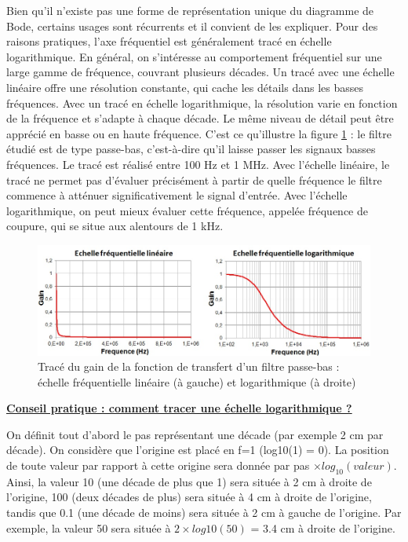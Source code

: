 	\vspace{0.5\baselineskip}

	Bien qu'il n'existe pas une forme de représentation unique du diagramme de Bode, certains usages sont récurrents et il convient de les expliquer. Pour des raisons pratiques, l'axe fréquentiel est généralement tracé en échelle logarithmique. En général, on s'intéresse au comportement fréquentiel sur une large gamme de fréquence, couvrant plusieurs décades. Un tracé avec une échelle linéaire offre une résolution constante, qui cache les détails dans les basses fréquences. Avec un tracé en échelle logarithmique, la résolution varie en fonction de la fréquence et s'adapte à chaque décade. Le même niveau de détail peut être apprécié en basse ou en haute fréquence. C'est ce qu'illustre la figure \ref{Fig:Effet_Flin_log} : le filtre étudié est de type passe-bas, c'est-à-dire qu'il laisse passer les signaux basses fréquences. Le tracé est réalisé entre 100 Hz et 1 MHz. Avec l'échelle linéaire, le tracé ne permet pas d'évaluer précisément à partir de quelle fréquence le filtre commence à atténuer significativement le signal d'entrée. Avec l'échelle logarithmique, on peut mieux évaluer cette fréquence, appelée fréquence de coupure, qui se situe aux alentours de 1 kHz.
	\begin{figure}[h]
		\centering
		\includegraphics[scale=0.6]{images/Effet_Flin_log.jpg}
		\caption{Tracé du gain de la fonction de transfert d'un filtre passe-bas : échelle fréquentielle linéaire (à gauche) et logarithmique (à droite)}	
		\label{Fig:Effet_Flin_log} 
	\end{figure}
	
	\textbf{\underline{Conseil pratique : comment tracer une échelle logarithmique ?}}
	
	On définit tout d'abord le pas représentant une décade (par exemple 2 cm par décade). On considère que l'origine est placé en f=1 (log10(1) = 0). La position de toute valeur par rapport à cette origine sera donnée par pas $\times log_{10}(valeur)$. Ainsi, la valeur 10 (une décade de plus que 1) sera située à 2 cm à droite de l'origine, 100 (deux décades de plus) sera située à 4 cm à droite de l'origine, tandis que 0.1 (une décade de moins) sera située à 2 cm à gauche de l'origine. Par exemple, la valeur 50 sera située à $2\times log10(50)$ = 3.4 cm à droite de l'origine.\\
	
